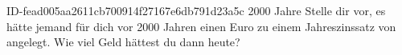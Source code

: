 \begin{exercise}
      {ID-fead005aa2611cb700914f27167e6db791d23a5c}
      {2000 Jahre}
  \ifproblem\problem
    Stelle dir vor, es hätte jemand für dich vor \num{2000} Jahren einen
    Euro zu einem Jahreszinssatz von  angelegt. Wie viel Geld
    hättest du dann heute?
  \fi
\end{exercise}
